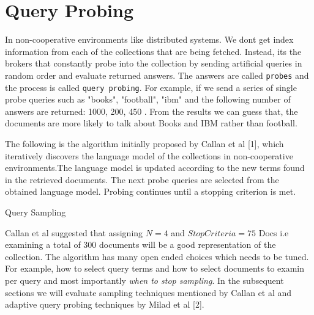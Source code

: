 \documentclass[paper=a4, fontsize=11pt,twoside]{scrartcl}	%
\begin{document}
\makeatletter
\def\BState{\State\hskip-\ALG@thistlm}
\makeatother

\section{Query Probing}
In non-cooperative environments like distributed systems. We dont get index information from each of the collections that are being fetched. Instead, its the brokers that constantly probe into the collection by sending artificial queries in random order and evaluate returned answers. The answers are called \texttt{probes} 
and the process is called \texttt{query probing}. For example, if we send a series of single probe queries such as "books", "football", "ibm" and the following number of answers are returned: 1000, 200, 450 . From the results we can guess that, the documents are more likely to talk about Books and IBM rather than football. 


The following is the algorithm initially proposed by Callan et al [1], which iteratively discovers the 
language model of the collections in non-cooperative environments.The language model is updated 
according to the new terms found in the retrieved documents. The next probe queries are selected from the obtained language model. Probing continues until a stopping criterion is met.




\begin{algorithm}
\caption{Query Sampling}\label{Query Sampling}
\end{algorithm}



Callan et al suggested that assigning $N = 4$  and  $StopCriteria = 75$ Docs i.e examining a total of 300 documents will be a good representation of the collection. The algorithm has many open ended choices which needs to be tuned. For example, how to select query terms and how to select documents to examin per query and most importantly \textit{when to stop sampling}. In the subsequent sections we will evaluate sampling techniques mentioned by Callan et al and adaptive query probing techniques by Milad et al [2]. 
\end{document}
